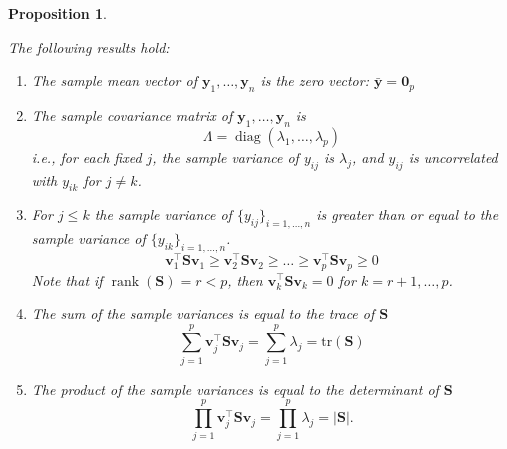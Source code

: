 \documentclass[
]{book}
\newtheorem{proposition}{Proposition}[chapter]
\theoremstyle{definition}
\theoremstyle{definition}
\theoremstyle{definition}
\theoremstyle{definition}
\theoremstyle{remark}
\begin{document}
\begin{proposition}
\protect\hypertarget{prp:pca2}{}\label{prp:pca2}

The following results hold:

\begin{enumerate}
\def\labelenumi{\arabic{enumi}.}
\item
  The sample mean vector of \(\mathbf y_1, \ldots , \mathbf y_n\) is the zero vector: \(\bar{\mathbf y}={\mathbf 0}_p\)
\item
  The sample covariance matrix of \(\mathbf y_1, \ldots, \mathbf y_n\) is
  \[\Lambda = \operatorname{diag}(\lambda_1, \ldots, \lambda_p)\]
  i.e., for each fixed \(j\), the sample variance of \(y_{ij}\) is \(\lambda_j\), and \(y_{ij}\) is uncorrelated with \(y_{ik}\) for \(j\not = k\).
\item
  For \(j\leq k\) the sample variance of \(\{y_{ij}\}_{i=1, \ldots , n}\) is greater than or equal to the sample variance of \(\{y_{ik}\}_{i=1, \ldots , n}\).
  \[\mathbf v_1^\top \mathbf S\mathbf v_1 \geq \mathbf v_2^\top \mathbf S\mathbf v_2 \geq \ldots \geq \mathbf v_p^\top \mathbf S\mathbf v_p\geq 0\]
  Note that if \(\operatorname{rank}(\mathbf S)=r<p\), then \(\mathbf v_k^\top \mathbf S\mathbf v_k = 0\) for \(k=r+1, \ldots, p\).
\item
  The sum of the sample variances is equal to the trace of \(\mathbf S\)
  \[\sum_{j=1}^p \mathbf v_j^\top \mathbf S\mathbf v_j = \sum_{j=1}^p \lambda_j = \text{tr}(\mathbf S)\]
\item
  The product of the sample variances is equal to the determinant of \(\mathbf S\)
  \[\prod_{j=1}^p \mathbf v_j^\top \mathbf S\mathbf v_j = \prod_{j=1}^p \lambda_j = |\mathbf S|.\]
\end{enumerate}

\end{proposition}
\end{document}
